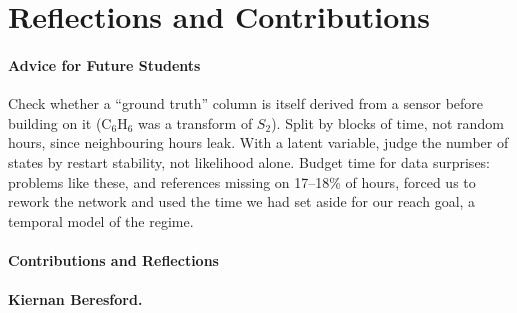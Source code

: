 \section{Reflections and Contributions}
\label{sec:reflections}

%

\paragraph*{Advice for Future Students}
Check whether a ``ground truth'' column is itself derived from a sensor
before building on it (C$_6$H$_6$ was a transform of $S_2$). Split by blocks of
time, not random hours, since neighbouring hours leak. With a latent variable,
judge the number of states by restart stability, not likelihood alone. Budget
time for data surprises: problems like these, and references missing on
17--18\% of hours, forced us to rework the network and used the time we had set
aside for our reach goal, a temporal model of the regime.


\paragraph*{Contributions and Reflections}

\paragraph{Kiernan Beresford.}


